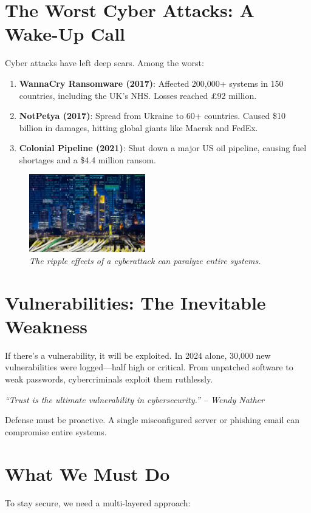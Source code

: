 \documentclass[a4paper,10pt,twocolumn]{memoir}
\newenvironment{magquote}
  {\begin{shaded*}\itshape\small}
  {\end{shaded*}}
\begin{document}
\section*{The Worst Cyber Attacks: A Wake-Up Call}
Cyber attacks have left deep scars. Among the worst:

\begin{enumerate}[label=\arabic*.]
  \item \textbf{WannaCry Ransomware (2017)}: Affected 200,000+ systems in 150 countries, including the UK’s NHS. Losses reached £92 million.
  \item \textbf{NotPetya (2017)}: Spread from Ukraine to 60+ countries. Caused \$10 billion in damages, hitting global giants like Maersk and FedEx.
  \item \textbf{Colonial Pipeline (2021)}: Shut down a major US oil pipeline, causing fuel shortages and a \$4.4 million ransom.
\end{enumerate}

\begin{figure}[h]
  \centering
  \includegraphics[width=0.45\textwidth]{city.png}
  \caption*{\textit{The ripple effects of a cyberattack can paralyze entire systems.}}
\end{figure}

\section*{Vulnerabilities: The Inevitable Weakness}
If there's a vulnerability, it will be exploited. In 2024 alone, 30,000 new vulnerabilities were logged—half high or critical. From unpatched software to weak passwords, cybercriminals exploit them ruthlessly.

\begin{magquote}
``Trust is the ultimate vulnerability in cybersecurity.'' -- Wendy Nather
\end{magquote}

Defense must be proactive. A single misconfigured server or phishing email can compromise entire systems.

\section*{What We Must Do}
To stay secure, we need a multi-layered approach:
\end{document}
